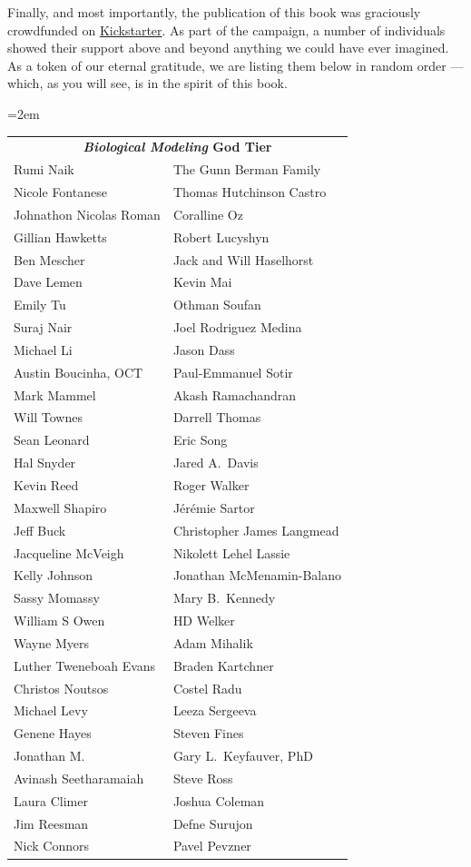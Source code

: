 Finally, and most importantly, the publication of this book was graciously crowdfunded on \href{https://www.kickstarter.com/projects/phillipcompeau/biological-modeling-a-short-tour?ref=user_menu}{Kickstarter}. As part of the campaign, a number of individuals showed their support above and beyond anything we could have ever imagined. As a token of our eternal gratitude, we are listing them below in random order --- which, as you will see, is in the spirit of this book.
\begin{center}
\tabcolsep=2em
\begin{tabular}{l l}
\multicolumn{2}{c}{\textbf{\textit{Biological Modeling} God Tier}}\\[4ex]
Rumi Naik & The Gunn Berman Family\\
Nicole Fontanese & Thomas Hutchinson Castro\\
Johnathon Nicolas Roman & Coralline Oz\\
Gillian Hawketts & Robert Lucyshyn\\
Ben Mescher & Jack and Will Haselhorst\\
Dave Lemen & Kevin Mai\\
Emily Tu & Othman Soufan\\
Suraj Nair & Joel Rodriguez Medina\\
Michael Li & Jason Dass\\
Austin Boucinha, OCT & Paul-Emmanuel Sotir\\
Mark Mammel & Akash Ramachandran\\
Will Townes & Darrell Thomas\\
Sean Leonard & Eric Song\\
Hal Snyder & Jared A.~Davis\\
Kevin Reed & Roger Walker\\
Maxwell Shapiro & Jérémie Sartor\\
Jeff Buck & Christopher James Langmead\\
Jacqueline McVeigh & Nikolett Lehel Lassie\\
Kelly Johnson & Jonathan McMenamin-Balano\\
Sassy Momassy & Mary B.~Kennedy\\
William S Owen & HD Welker\\
Wayne Myers & Adam Mihalik\\
Luther Tweneboah Evans & Braden Kartchner\\
Christos Noutsos & Costel Radu\\
Michael Levy & Leeza Sergeeva\\
Genene Hayes & Steven Fines\\
Jonathan M. & Gary L.~Keyfauver, PhD\\
Avinash Seetharamaiah & Steve Ross\\
Laura Climer & Joshua Coleman\\
Jim Reesman & Defne Surujon\\
Nick Connors & Pavel Pevzner\\
\end{tabular}
\end{center}

%
%

\newpage \phantom{}
\thispagestyle{empty}